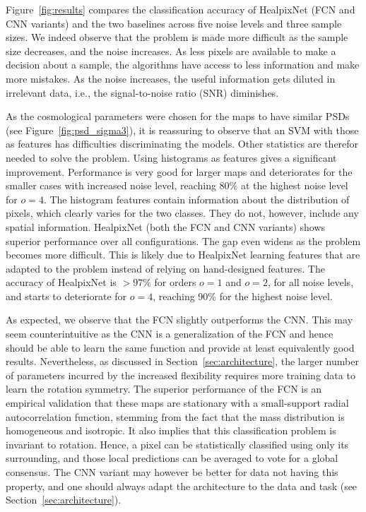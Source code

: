 \documentclass[final,twocolumn,3p,times,sort&compress]{elsarticle}
\newcommand{\figref}[1]{Figure~\ref{fig:#1}}
\newcommand{\secref}[1]{Section~\ref{sec:#1}}
\newcommand{\1}{\b{1}}              %
\newcommand{\0}{\b{0}}              %
\begin{document}
\figref{results} compares the classification accuracy of HealpixNet (FCN and CNN variants) and the two baselines across five noise levels and three sample sizes.
We indeed observe that the problem is made more difficult as the sample size decreases, and the noise increases.
As less pixels are available to make a decision about a sample, the algorithms have access to less information and make more mistakes.
As the noise increases, the useful information gets diluted in irrelevant data, i.e., the signal-to-noise ratio (SNR) diminishes.

As the cosmological parameters were chosen for the maps to have similar PSDs (see \figref{psd_sigma3}), it is reassuring to observe that an SVM with those as features has difficulties discriminating the models.
Other statistics are therefor needed to solve the problem. Using histograms as features gives a significant improvement.
Performance is very good for larger maps and deteriorates for the smaller cases with increased noise level, reaching 80\% at the highest noise level for $o=4$.
The histogram features contain information about the distribution of pixels, which clearly varies for the two classes.
They do not, however, include any spatial information.
HealpixNet (both the FCN and CNN variants) shows superior performance over all configurations.
The gap even widens as the problem becomes more difficult.
This is likely due to HealpixNet learning features that are adapted to the problem instead of relying on hand-designed features.
The accuracy of HealpixNet is $>97\%$ for orders $o=1$ and $o=2$, for all noise levels, and starts to deteriorate for $o=4$, reaching 90\% for the highest noise level.

As expected, we observe that the FCN slightly outperforms the CNN.
This may seem counterintuitive as the CNN is a generalization of the FCN and hence should be able to learn the same function and provide at least equivalently good results.
Nevertheless, as discussed in \secref{architecture}, the larger number of parameters incurred by the increased flexibility requires more training data to learn the rotation symmetry.
The superior performance of the FCN is an empirical validation that these maps are stationary with a small-support radial autocorrelation function, stemming from the fact that the mass distribution is homogeneous and isotropic.
It also implies that this classification problem is invariant to rotation.
Hence, a pixel can be statistically classified using only its surrounding, and those local predictions can be averaged to vote for a global consensus.
The CNN variant may however be better for data not having this property, and one should always adapt the architecture to the data and task (see \secref{architecture}).
\end{document}

